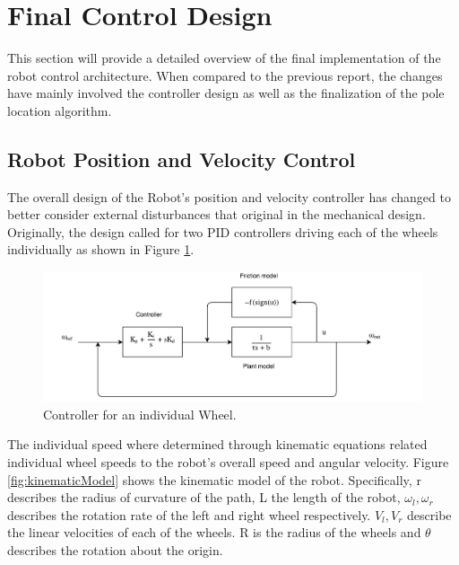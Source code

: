 \documentclass[ece]{uw-wkrpt}
\let\oldsection\section
\renewcommand\section{\clearpage\oldsection}
\begin{document}
\section{Final Control Design} \label{controls}

This section will provide a detailed overview of the final implementation of the robot control architecture. When compared to the previous report, the changes have mainly involved the controller design as well as the finalization of the pole location algorithm.

\subsection{Robot Position and Velocity Control}
The overall design of the Robot's position and velocity controller has changed to better consider external disturbances that original in the mechanical design. Originally, the design called for two PID controllers driving each of the wheels individually as shown in Figure \ref{fig:singleWheelController}. 

\begin{figure}
    \centering
    \includegraphics[width=5.5in]{res/380ModelForWheel}
    \caption[Controller for an individual Wheel]
          {Controller for an individual Wheel.}
    \label{fig:singleWheelController}
\end{figure}

The individual speed where determined through kinematic equations related individual wheel speeds to the robot's overall speed and angular velocity. Figure \ref{fig:kinematicModel} shows the kinematic model of the robot. Specifically, r describes the radius of curvature of the path, L the length of the robot, $\omega_l, \omega_r$ describes the rotation rate of the left and right wheel respectively. $V_l, V_r$ describe the linear velocities of each of the wheels. R is the radius of the wheels and $\theta$ describes the rotation about the origin. 
\end{document}
